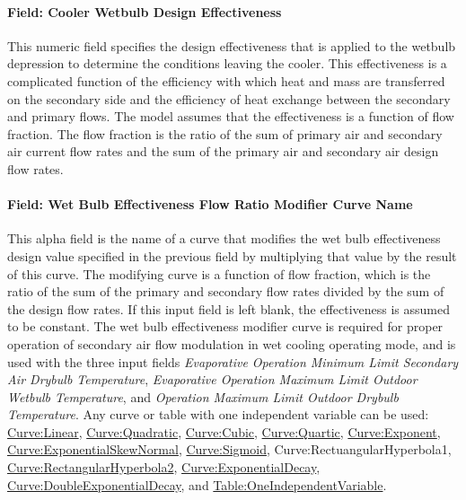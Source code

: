 \paragraph{Field: Cooler Wetbulb Design Effectiveness}\label{field-cooler-wetbulb-design-effectiveness}

This numeric field specifies the design effectiveness that is applied to the wetbulb depression to determine the conditions leaving the cooler. This effectiveness is a complicated function of the efficiency with which heat and mass are transferred on the secondary side and the efficiency of heat exchange between the secondary and primary flows. The model assumes that the effectiveness is a function of flow fraction. The flow fraction is the ratio of the sum of primary air and secondary air current flow rates and the sum of the primary air and secondary air design flow rates.

\paragraph{Field: Wet Bulb Effectiveness Flow Ratio Modifier Curve Name}\label{field-wet-bulb-effectiveness-flow-ratio-modifier-curve-name}

This alpha field is the name of a curve that modifies the wet bulb effectiveness design value specified in the previous field by multiplying that value by the result of this curve. The modifying curve is a function of flow fraction, which is the ratio of the sum of the primary and secondary flow rates divided by the sum of the design flow rates. If this input field is left blank, the effectiveness is assumed to be constant. The wet bulb effectiveness modifier curve is required for proper operation of secondary air flow modulation in wet cooling operating mode, and is used with the three input fields \textit{Evaporative Operation Minimum Limit Secondary Air Drybulb Temperature}, \textit{Evaporative Operation Maximum Limit Outdoor Wetbulb Temperature}, and \textit{Operation Maximum Limit Outdoor Drybulb Temperature}. Any curve or table with one independent variable can be used: \hyperref[curvelinear]{Curve:Linear}, \hyperref[curvequadratic]{Curve:Quadratic}, \hyperref[curvecubic]{Curve:Cubic}, \hyperref[curvequartic]{Curve:Quartic}, \hyperref[curveexponent]{Curve:Exponent}, \hyperref[curveexponentialskewnormal]{Curve:ExponentialSkewNormal}, \hyperref[curvesigmoid]{Curve:Sigmoid}, Curve:RectuangularHyperbola1, \hyperref[curverectangularhyperbola2]{Curve:RectangularHyperbola2}, \hyperref[curveexponentialdecay]{Curve:ExponentialDecay}, \hyperref[curvedoubleexponentialdecay]{Curve:DoubleExponentialDecay}, and \hyperref[tableoneindependentvariable]{Table:OneIndependentVariable}.

